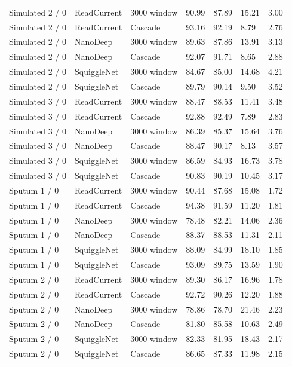 \begin{longtable}{lllllll}
Simulated 2 / 0 & ReadCurrent & 3000 window & 90.99 & 87.89 & 15.21 & 3.00\\
Simulated 2 / 0 & ReadCurrent & Cascade & 93.16 & 92.19 & 8.79 & 2.76\\
Simulated 2 / 0 & NanoDeep & 3000 window & 89.63 & 87.86 & 13.91 & 3.13\\
Simulated 2 / 0 & NanoDeep & Cascade & 92.07 & 91.71 & 8.65 & 2.88\\
Simulated 2 / 0 & SquiggleNet & 3000 window & 84.67 & 85.00 & 14.68 & 4.21\\
Simulated 2 / 0 & SquiggleNet & Cascade & 89.79 & 90.14 & 9.50 & 3.52\\
Simulated 3 / 0 & ReadCurrent & 3000 window & 88.47 & 88.53 & 11.41 & 3.48\\
Simulated 3 / 0 & ReadCurrent & Cascade & 92.88 & 92.49 & 7.89 & 2.83\\
Simulated 3 / 0 & NanoDeep & 3000 window & 86.39 & 85.37 & 15.64 & 3.76\\
Simulated 3 / 0 & NanoDeep & Cascade & 88.47 & 90.17 & 8.13 & 3.57\\
Simulated 3 / 0 & SquiggleNet & 3000 window & 86.59 & 84.93 & 16.73 & 3.78\\
Simulated 3 / 0 & SquiggleNet & Cascade & 90.83 & 90.19 & 10.45 & 3.17\\
Sputum 1 / 0 & ReadCurrent & 3000 window & 90.44 & 87.68 & 15.08 & 1.72\\
Sputum 1 / 0 & ReadCurrent & Cascade & 94.38 & 91.59 & 11.20 & 1.81\\
Sputum 1 / 0 & NanoDeep & 3000 window & 78.48 & 82.21 & 14.06 & 2.36\\
Sputum 1 / 0 & NanoDeep & Cascade & 88.37 & 88.53 & 11.31 & 2.11\\
Sputum 1 / 0 & SquiggleNet & 3000 window & 88.09 & 84.99 & 18.10 & 1.85\\
Sputum 1 / 0 & SquiggleNet & Cascade & 93.09 & 89.75 & 13.59 & 1.90\\
Sputum 2 / 0 & ReadCurrent & 3000 window & 89.30 & 86.17 & 16.96 & 1.78\\
Sputum 2 / 0 & ReadCurrent & Cascade & 92.72 & 90.26 & 12.20 & 1.88\\
Sputum 2 / 0 & NanoDeep & 3000 window & 78.86 & 78.70 & 21.46 & 2.23\\
Sputum 2 / 0 & NanoDeep & Cascade & 81.80 & 85.58 & 10.63 & 2.49\\
Sputum 2 / 0 & SquiggleNet & 3000 window & 82.33 & 81.95 & 18.43 & 2.17\\
Sputum 2 / 0 & SquiggleNet & Cascade & 86.65 & 87.33 & 11.98 & 2.15\\

\end{longtable}
